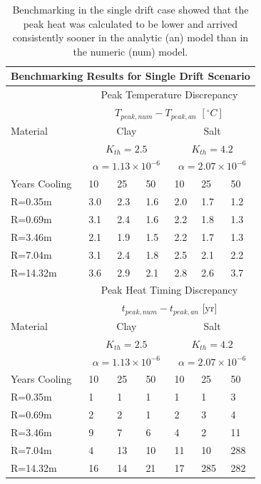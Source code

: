 \documentclass{anstrans}
\begin{document}
\begin{table}
  \centering
  \footnotesize{
  \begin{tabular}{|l|l|l|l|l|l|l|}
    \multicolumn{7}{c}{\textbf{Benchmarking Results for Single Drift 
    Scenario}}\\
    \hline
    & \multicolumn{6}{|c|}{Peak Temperature Discrepancy}\\ 
    & \multicolumn{6}{|c|}{$T_{peak,num}-T_{peak,an}$ $[^{\circ}C]$} \\
    \hline
    Material & \multicolumn{3}{|c|}{Clay} & \multicolumn{3}{|c|}{Salt}\\ & 
    \multicolumn{3}{|c|}{$K_{th}=2.5$} & \multicolumn{3}{|c|}{$K_{th}=4.2$}\\ & 
    \multicolumn{3}{|c|}{$\alpha=1.13\times10^{-6}$} & 
    \multicolumn{3}{|c|}{$\alpha=2.07\times10^{-6}$}\\ 
    \hline
    Years Cooling  & 10     & 25      & 50      & 10     & 25     & 50\\
    \hline
     R=0.35m  & 3.0   & 2.3     & 1.6    & 2.0   & 1.7   & 1.2\\
     R=0.69m  & 3.1   & 2.4    & 1.6    & 2.2    & 1.8   & 1.3\\
     R=3.46m  & 2.1   & 1.9    & 1.5    & 2.2   & 1.7    & 1.3\\
     R=7.04m  & 3.1   & 2.4     & 1.8    & 2.5   & 2.1   & 2.2\\
     R=14.32m & 3.6   & 2.9    & 2.1    & 2.8   & 2.6   & 3.7\\
    \hline
    & \multicolumn{6}{|c|}{Peak Heat Timing Discrepancy}\\ 
    & \multicolumn{6}{|c|}{ $t_{peak,num}-t_{peak,an}$ [yr]} \\
    \hline
    Material & \multicolumn{3}{|c|}{Clay} & \multicolumn{3}{|c|}{Salt}\\ & 
    \multicolumn{3}{|c|}{$K_{th}=2.5$} & \multicolumn{3}{|c|}{$K_{th}=4.2$}\\ & 
    \multicolumn{3}{|c|}{$\alpha=1.13\times10^{-6}$} & 
    \multicolumn{3}{|c|}{$\alpha=2.07\times10^{-6}$}\\ \hline
    Years Cooling  & 10     & 25      & 50      & 10     & 25     & 50\\
    \hline
     R=0.35m  & 1    & 1       & 1   & 1      & 1      & 3\\
     R=0.69m  & 2    & 2       & 1    & 2      & 3      & 4\\
     R=3.46m  & 9    & 7       & 6    & 4      & 2      & 11\\
     R=7.04m  & 4    & 13      & 10    & 11     & 10     & 288\\
     R=14.32m & 16   & 14      & 21   & 17     & 285    & 282\\
    \hline
  \end{tabular}
  \caption{Benchmarking in the single drift case showed that the peak heat was 
  calculated to be lower and arrived consistently sooner in the analytic (an) 
  model than in the numeric (num) model. 
  }
  \label{tab:benchSingle}
  }
\end{table}
\end{document}
